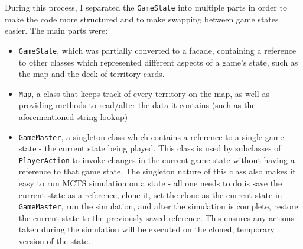 During this process, I separated the \texttt{GameState} into multiple parts in order to make the code more structured and to make swapping between game states easier. The main parts were:
\begin{itemize}
\item \texttt{GameState}, which was partially converted to a facade, containing a reference to other classes which represented different aspects of a game's state, such as the map and the deck of territory cards.
\item \texttt{Map}, a class that keeps track of every territory on the map, as well as providing methods to read/alter the data it contains (such as the aforementioned string lookup)
\item \texttt{GameMaster}, a singleton class which contains a reference to a single game state - the current state being played. This class is used by subclasses of \texttt{PlayerAction} to invoke changes in the current game state without having a reference to that game state. The singleton nature of this class also makes it easy to run MCTS simulation on a state - all one needs to do is save the current state as a reference, clone it, set the clone as the current state in \texttt{GameMaster}, run the simulation, and after the simulation is complete, restore the current state to the previously saved reference. This ensures any actions taken during the simulation will be executed on the cloned, temporary version of the state.
\end{itemize}